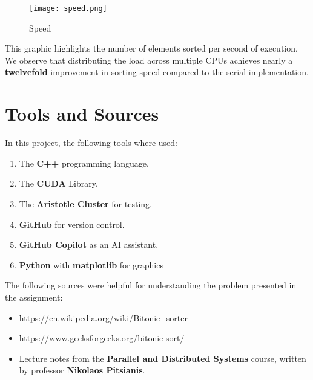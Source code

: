 \documentclass[12pt]{report}
\begin{document}
\begin{figure}[H]
    \centering
    \texttt{[image: speed.png]}
    \caption{Speed}
    \label{fig:enter-label}
\end{figure}

This graphic highlights the number of elements sorted per second of execution. We observe that distributing the load across multiple CPUs achieves nearly a \textbf{twelvefold} improvement in sorting speed compared to the serial implementation.

\chapter{Tools and Sources}

In this project, the following tools where used:
\begin{enumerate}
    \item The \textbf{C++} programming language.
    \item The \textbf{CUDA} Library.
    \item The \textbf{Aristotle Cluster} for testing.
    \item \textbf{GitHub} for version control.
    \item \textbf{GitHub Copilot} as an AI assistant.
    \item \textbf{Python} with \textbf{matplotlib} for graphics
\end{enumerate}

The following sources were helpful for understanding the problem presented in the assignment:
\begin{itemize}
    \item \url{https://en.wikipedia.org/wiki/Bitonic_sorter}
    \item \url{https://www.geeksforgeeks.org/bitonic-sort/}
    \item Lecture notes from the \textbf{Parallel and Distributed Systems} course, written by professor \textbf{Nikolaos Pitsianis}.
\end{itemize}
\end{document}
